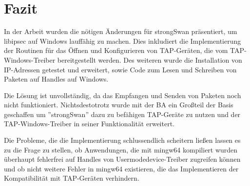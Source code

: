 



\section{Fazit}

In der Arbeit wurden die nötigen Änderungen für strongSwan präsentiert, um
libipsec auf Windows lauffähig zu machen. Dies inkludiert die Implementierung
der Routinen für das Öffnen und Konfigurieren von TAP-Geräten, die vom TAP-Windows-Treiber
bereitgestellt werden. Des weiteren wurde die Installation von IP-Adressen getestet
und erweitert, sowie Code zum Lesen und Schreiben von Paketen auf Handles auf Windows.

Die Lösung ist unvollständig, da das Empfangen und Senden von Paketen noch nicht funktioniert.
Nichtsdestotrotz wurde mit der \ac{BA} ein Großteil der Basis geschaffen um ''strongSwan''
dazu zu befähigen TAP-Geräte zu nutzen und der TAP-Windows-Treiber in seiner Funktionalität
erweitert.

Die Probleme, die die Implementierung schlussendlich scheitern ließen lassen es zu
die Frage zu stellen, ob Anwendungen, die mit mingw64 kompiliert wurden überhaupt
fehlerfrei auf Handles von Usermodedevice-Treiber zugreifen können und ob
nicht weitere Fehler in mingw64 existieren, die das Implementieren der Kompatibilität
mit TAP-Geräten verhindern.

